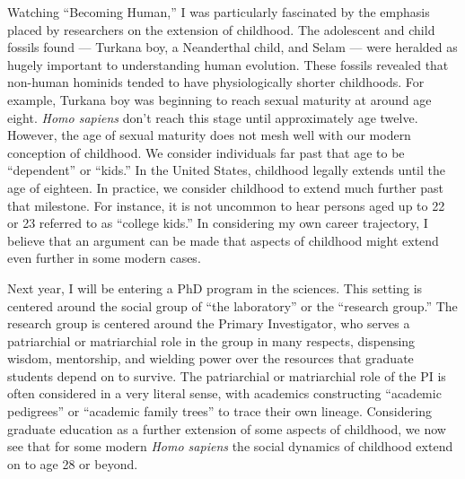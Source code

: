 Watching ``Becoming Human,'' I was particularly fascinated by the emphasis placed by researchers on the extension of childhood.
The adolescent and child fossils found --- Turkana boy, a Neanderthal child, and Selam  --- were heralded as hugely important to understanding human evolution.
These fossils revealed that non-human hominids tended to have physiologically shorter childhoods.
For example, Turkana boy was beginning to reach sexual maturity at around age eight.
\textit{Homo sapiens} don't reach this stage until approximately age twelve.
However, the age of sexual maturity does not mesh well with our modern conception of childhood.
We consider individuals far past that age to be ``dependent'' or ``kids.''
In the United States, childhood legally extends until the age of eighteen.
In practice, we consider childhood to extend much further past that milestone.
For instance, it is not uncommon to hear persons aged up to 22 or 23 referred to as ``college kids.''
In considering my own career trajectory, I believe that an argument can be made that aspects of childhood might extend even further in some modern cases.

Next year, I will be entering a PhD program in the sciences.
This setting is centered around the social group of ``the laboratory'' or the ``research group.'' The research group is centered around the Primary Investigator, who serves a patriarchial or matriarchial role in the group in many respects, dispensing wisdom, mentorship, and wielding power over the resources that graduate students depend on to survive.
The patriarchial or matriarchial role of the PI is often considered in a very literal sense, with academics constructing ``academic pedigrees'' or ``academic family trees'' to trace their own lineage.
Considering graduate education as a further extension of some aspects of childhood, we now see that for some modern \textit{Homo sapiens} the social dynamics of childhood extend on to age 28 or beyond.

